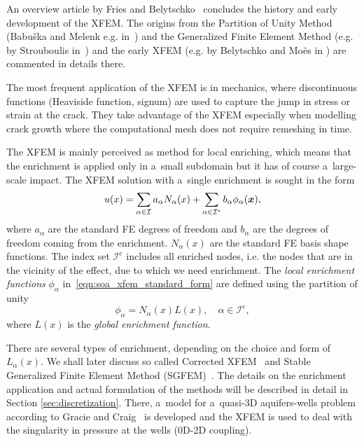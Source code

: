 \documentclass[FM,Dis]{tulthesis}
\begin{document}
An overview article by Fries and Belytschko~\cite{fries_xfem_overview_2010} concludes the history and early development
of the XFEM. The origins from the Partition of Unity Method (Babu{\v s}ka and Melenk e.g. in~\cite{babuska_partition_1997}) and
the Generalized Finite Element Method (e.g. by Strouboulis in~\cite{strouboulis_generalized_2000}) 
and the early XFEM (e.g. by Belytschko and Mo{\"e}s in \cite{moes_finite_1999}) are commented in details there.

The most frequent application of the XFEM is in mechanics, where discontinuous functions (Heaviside function, signum)
are used to capture the jump in stress or strain at the crack. They take advantage of the XFEM especially when 
modelling crack growth where the computational mesh does not require remeshing in time.

The XFEM is mainly perceived as method for local enriching, which means that the enrichment is applied only
in a~small subdomain but it has of course a~large-scale impact.
The XFEM solution with a~single enrichment is sought in the form
\begin{equation} \label{eqn:soa_xfem_standard_form}
  u(x) = \sum_{\alpha\in\mathcal{I}}a_\alpha N_\alpha(x)
    + \sum_{\alpha\in\mathcal{I}^e} b_{\alpha} \phi_{\alpha}(\mathbf{\boldsymbol{x}}),
\end{equation}
where $a_\alpha$ are the standard FE degrees of freedom and $b_{\alpha}$ are the degrees of freedom coming from
the enrichment. $N_\alpha(x)$ are the standard FE basis shape functions. The index set $\mathcal{I}^e$ includes 
all enriched nodes, i.e. the nodes that are in the vicinity of the effect, due to which we need enrichment.
The \emph{local enrichment functions} $\phi_{\alpha}$ in~\eqref{eqn:soa_xfem_standard_form} are defined
using the partition of unity
\begin{equation} \label{eqn:soa_xfem_enrich}
    \phi_{\alpha} = N_\alpha(x)L(x), \quad \alpha\in\mathcal{I}^e,
\end{equation}
where $L(x)$ is the \emph{global enrichment function}.

There are several types of enrichment, depending on the choice and form of $L_{\alpha}(x)$. We shall later
discuss so called Corrected XFEM~\cite{fries_corrected_2008} and Stable Generalized Finite Element Method (SGFEM)~\cite{babuska_stable_2012, gupta_stable_2013}.
The details on the enrichment application and actual formulation of the methods will be described in detail in Section
\ref{sec:discretization}. There, a~model for a~quasi-3D aquifers-wells problem according to Gracie and Craig~\cite{gracie_modelling_2010,craig_using_2011}
is developed and the XFEM is used to deal with the singularity in pressure at the wells (0D-2D coupling).
\end{document}
